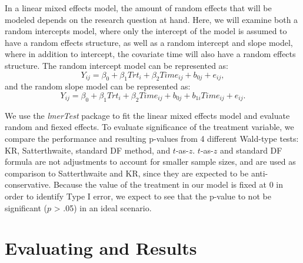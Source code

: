 \documentclass[12pt, twoside]{amherstthesis}
\begin{document}
In a linear mixed effects model, the amount of random effects that will be modeled depends on the research question at hand. Here, we will examine both a random intercepts model, where only the intercept of the model is assumed to have a random effects structure, as well as a random intercept and slope model, where in addition to intercept, the covariate time will also have a random effects structure. The random intercept model can be represented as: \[Y_{ij} = \beta_0 + \beta_1Trt_i + \beta_2Time_{ij} + b_{0j} + e_{ij},\] and the random slope model can be represented as: \[Y_{ij} = \beta_0 + \beta_1Trt_i + \beta_2Time_{ij} + b_{0j} + b_{1i}Time_{ij} + e_{ij}.\]

We use the \emph{lmerTest} package to fit the linear mixed effects model and evaluate random and fiexed effects. To evaluate significance of the treatment variable, we compare the performance and resulting p-values from 4 different Wald-type tests: KR, Satterthwaite, standard DF method, and \(t\)-as-\(z\). \(t\)-as-\(z\) and standard DF formula are not adjustments to account for smaller sample sizes, and are used as comparison to Satterthwaite and KR, since they are expected to be anti-conservative. Because the value of the treatment in our model is fixed at 0 in order to identify Type I error, we expect to see that the p-value to not be significant (\(p\) \textgreater{} .05) in an ideal scenario.

\hypertarget{evaluating-and-results}{%
\section{Evaluating and Results}\label{evaluating-and-results}}
\end{document}
